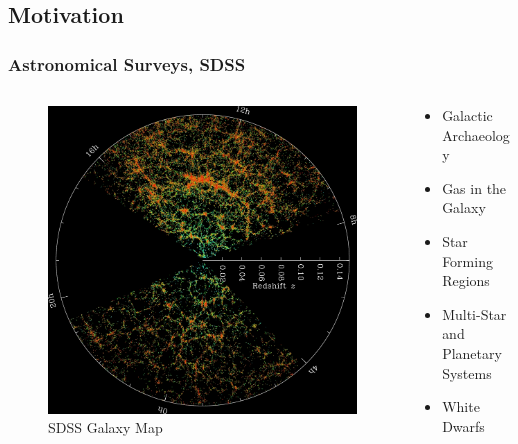 \documentclass{beamer}
\begin{document}
\subsection{Motivation}
\begin{frame}
 	\frametitle{Astronomical Surveys, SDSS}
    \begin{columns}[onlytextwidth]
    \begin{column}{.45\textwidth}
        \begin{figure}
            \includegraphics[width=\textwidth]{img/sdss_galaxy_map.jpg}
            \caption*{SDSS Galaxy Map}
        \end{figure}
    \end{column}
    \hfill
    \begin{column}{.45\textwidth}
    \begin{itemize}
        \item Galactic Archaeology
        \item Gas in the Galaxy
        \item Star Forming Regions
        \item Multi-Star and Planetary Systems
        \item White Dwarfs
    \end{itemize}
    \end{column}
    \end{columns}
    \end{frame}
\end{document}
